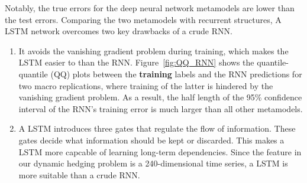 \documentclass{article}
\begin{document}
Notably, the true errors for the deep neural network metamodels are lower than the test errors.
Comparing the two metamodels with recurrent structures, A LSTM network overcomes two key drawbacks of a crude RNN.
\begin{enumerate}
    \item It avoids the vanishing gradient problem during training, which makes the LSTM easier to than the RNN. Figure~\ref{fig:QQ_RNN} shows the quantile-quantile (QQ) plots between the \textbf{training} labels and the RNN predictions for two macro replications, where training of the latter is hindered by the vanishing gradient problem. As a result, the half length of the 95\% confidence interval of the RNN's training error is much larger than all other metamodels.
    \item A LSTM introduces three gates that regulate the flow of information. These gates decide what information should be kept or discarded. This makes a LSTM more capcable of learning long-term dependencies. Since the feature in our dynamic hedging problem is a 240-dimensional time series, a LSTM is more suitable than a crude RNN.
\end{enumerate}
\end{document}
